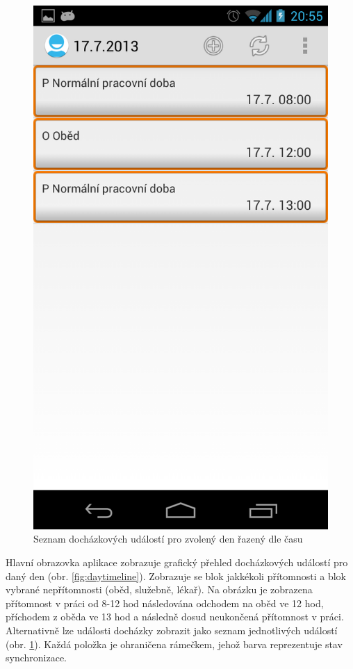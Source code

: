 \documentclass{diplomka}
\begin{document}
\begin{figure}[H]
\begin{minipage}{.45\textwidth}
  \includegraphics[width=.9\linewidth]{scr/daytimelinealt.png}
  \caption{Seznam docházkových událostí pro zvolený den řazený dle času}
  \label{fig:daytimelinealt}
\end{minipage}
\end{figure}
Hlavní obrazovka aplikace zobrazuje grafický přehled docházkových událostí pro daný den (obr. \ref{fig:daytimeline}). Zobrazuje se blok jakkékoli přítomnosti a blok vybrané nepřítomnosti (oběd, služebně, lékař). Na obrázku je zobrazena přítomnost v práci od 8-12 hod následována odchodem na oběd ve 12 hod, příchodem z oběda ve 13 hod a následně dosud neukončená přítomnost v práci. Alternativně lze události docházky zobrazit jako seznam jednotlivých událostí (obr. \ref{fig:daytimelinealt}). Každá položka je ohraničena rámečkem, jehož barva reprezentuje stav synchronizace.\newpage
\end{document}

